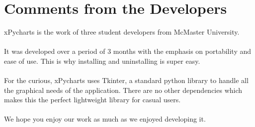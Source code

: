 \documentclass{article}
\begin{document}
\section{Comments from the Developers}
xPycharts is the work of three student developers from McMaster University. \\\\It was developed over a period of 3 months with the emphasis on portability and ease of use. This is why installing and uninstalling is super easy. \\\\For the curious, xPycharts uses Tkinter, a standard python library to handle all the graphical needs of the application. There are no other dependencies which makes this the perfect lightweight library for casual users.\\\\We hope you enjoy our work as much as we enjoyed developing it.
\end{document}
